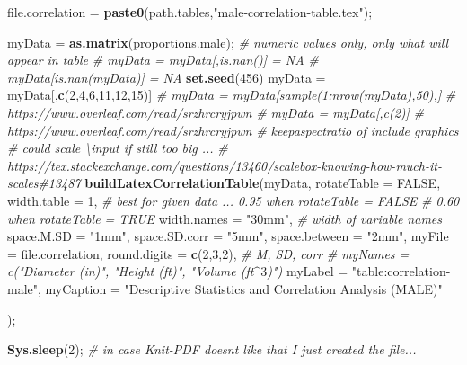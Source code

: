 \documentclass[]{article}
\newenvironment{Shaded}{\begin{snugshade}}{\end{snugshade}}
\newcommand{\CommentTok}[1]{\textcolor[rgb]{0.56,0.35,0.01}{\textit{#1}}}
\newcommand{\DataTypeTok}[1]{\textcolor[rgb]{0.13,0.29,0.53}{#1}}
\newcommand{\DecValTok}[1]{\textcolor[rgb]{0.00,0.00,0.81}{#1}}
\newcommand{\KeywordTok}[1]{\textcolor[rgb]{0.13,0.29,0.53}{\textbf{#1}}}
\newcommand{\NormalTok}[1]{#1}
\newcommand{\OtherTok}[1]{\textcolor[rgb]{0.56,0.35,0.01}{#1}}
\newcommand{\StringTok}[1]{\textcolor[rgb]{0.31,0.60,0.02}{#1}}
\begin{document}
\begin{Shaded}
\begin{Highlighting}[]
\NormalTok{file.correlation =}\StringTok{ }\KeywordTok{paste0}\NormalTok{(path.tables,}\StringTok{"male{-}correlation{-}table.tex"}\NormalTok{);}

\NormalTok{myData =}\StringTok{ }\KeywordTok{as.matrix}\NormalTok{(proportions.male);  }\CommentTok{\# numeric values only, only what will appear in table}
\CommentTok{\# myData = myData[,is.nan()] = NA}
\CommentTok{\# myData[is.nan(myData)] = NA}
\KeywordTok{set.seed}\NormalTok{(}\DecValTok{456}\NormalTok{)}
\NormalTok{myData =}\StringTok{ }\NormalTok{myData[,}\KeywordTok{c}\NormalTok{(}\DecValTok{2}\NormalTok{,}\DecValTok{4}\NormalTok{,}\DecValTok{6}\NormalTok{,}\DecValTok{11}\NormalTok{,}\DecValTok{12}\NormalTok{,}\DecValTok{15}\NormalTok{)]}
\CommentTok{\# myData = myData[sample(1:nrow(myData),50),]}
\CommentTok{\# https://www.overleaf.com/read/srzhrcryjpwn}
\CommentTok{\# myData = myData[,c(2)]}
\CommentTok{\# https://www.overleaf.com/read/srzhrcryjpwn}
\CommentTok{\# keepaspectratio of include graphics }
\CommentTok{\# could scale \textbackslash{}input if still too big ...}
\CommentTok{\# https://tex.stackexchange.com/questions/13460/scalebox{-}knowing{-}how{-}much{-}it{-}scales\#13487}
\KeywordTok{buildLatexCorrelationTable}\NormalTok{(myData, }
  \DataTypeTok{rotateTable =} \OtherTok{FALSE}\NormalTok{,}
  \DataTypeTok{width.table =} \DecValTok{1}\NormalTok{, }\CommentTok{\# best for given data ... 0.95 when rotateTable = FALSE}
                      \CommentTok{\# 0.60 when rotateTable = TRUE}
  \DataTypeTok{width.names =} \StringTok{"30mm"}\NormalTok{, }\CommentTok{\# width of variable names}
  \DataTypeTok{space.M.SD =} \StringTok{"1mm"}\NormalTok{,}
                                      \DataTypeTok{space.SD.corr =} \StringTok{"5mm"}\NormalTok{,}
                                      \DataTypeTok{space.between =} \StringTok{"2mm"}\NormalTok{,}
  \DataTypeTok{myFile =}\NormalTok{ file.correlation,}
  \DataTypeTok{round.digits =} \KeywordTok{c}\NormalTok{(}\DecValTok{2}\NormalTok{,}\DecValTok{3}\NormalTok{,}\DecValTok{2}\NormalTok{),  }\CommentTok{\# M, SD, corr}
  \CommentTok{\# myNames = c("Diameter (in)", "Height (ft)", "Volume (ft$\^{}3$)") }
  \DataTypeTok{myLabel =} \StringTok{"table:correlation{-}male"}\NormalTok{,}
  \DataTypeTok{myCaption =} \StringTok{"Descriptive Statistics and Correlation Analysis (MALE)"}

\NormalTok{  );}

\KeywordTok{Sys.sleep}\NormalTok{(}\DecValTok{2}\NormalTok{); }\CommentTok{\# in case Knit{-}PDF doesn\textquotesingle{}t like that I just created the file...}
\end{Highlighting}
\end{Shaded}
\end{document}
